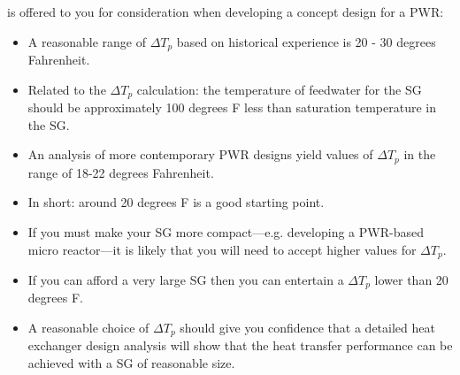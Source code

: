  is offered to you for consideration when developing a concept design for a PWR:
\begin{itemize}
\item A reasonable range of $\Delta T_p$ based on historical experience is 20 - 30 degrees Fahrenheit.\cite{rust1979nuclear}
\item Related to the $\Delta T_p$ calculation: the temperature of feedwater for the SG should be approximately 100 degrees F less than saturation temperature in the SG.\cite{el1982nuclear}
\item An analysis of more contemporary PWR designs yield values of $\Delta T_p$ in the range of 18-22 degrees Fahrenheit.
\item In short: around 20 degrees F is a good starting point.
\item If you must make your SG more compact---e.g. developing a PWR-based micro reactor---it is likely that you will need to accept higher values for $\Delta T_p$.
\item If you can afford a very large SG then you can entertain a $\Delta T_p$ lower than 20 degrees F.
\item A reasonable choice of $\Delta T_p$ should give you confidence that a detailed heat exchanger design analysis will show that the heat transfer performance can be achieved with a SG of reasonable size.
\end{itemize}



